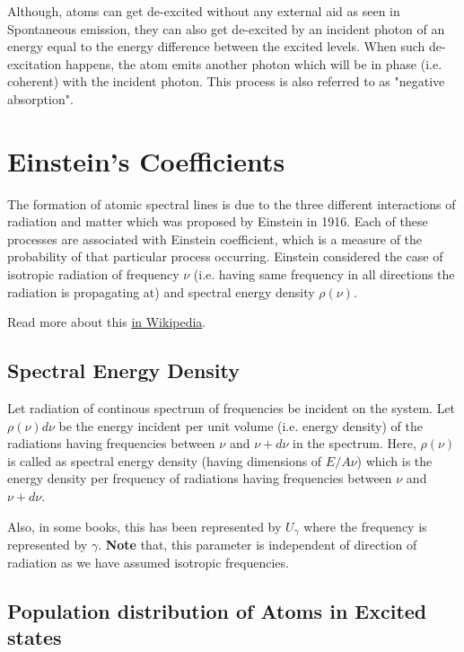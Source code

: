 \documentclass[12pt]{article}
\begin{document}
Although, atoms can get de-excited without any external aid as seen in Spontaneous emission, they can also get de-excited by an incident photon of an energy equal to the energy difference between the excited levels. When such de-excitation happens, the atom emits another photon which will be in phase (i.e. coherent) with the incident photon. This process is also referred to as "negative absorption".

\section{Einstein's Coefficients}

The formation of atomic spectral lines is due to the three different interactions of radiation and matter which was proposed by Einstein in 1916. Each of these processes are associated with Einstein coefficient, which is a measure of the probability of that particular process occurring. Einstein considered the case of isotropic radiation of frequency $\nu$ (i.e. having same frequency in all directions the radiation is propagating at) and spectral energy density $\rho(\nu)$. \vspace{.2cm}

Read more about this \href{https://en.wikipedia.org/wiki/Einstein_coefficients}{in Wikipedia}.

\subsection{Spectral Energy Density}

Let radiation of continous spectrum of frequencies be incident on the system. Let $\rho(\nu)d\nu$ be the energy incident per unit volume (i.e. energy density) of the radiations having frequencies between $\nu$ and $\nu + d\nu$ in the spectrum. Here, $\rho(\nu)$ is called as spectral energy density (having dimensions of $E/A\nu$) which is the energy density per frequency of radiations having frequencies between $\nu$ and $\nu + d\nu$.

Also, in some books, this has been represented by $U_{\gamma}$ where the frequency is represented by $\gamma$. \textbf{Note} that, this parameter is independent of direction of radiation as we have assumed isotropic frequencies.

\subsection{Population distribution of Atoms in Excited states}
\end{document}
